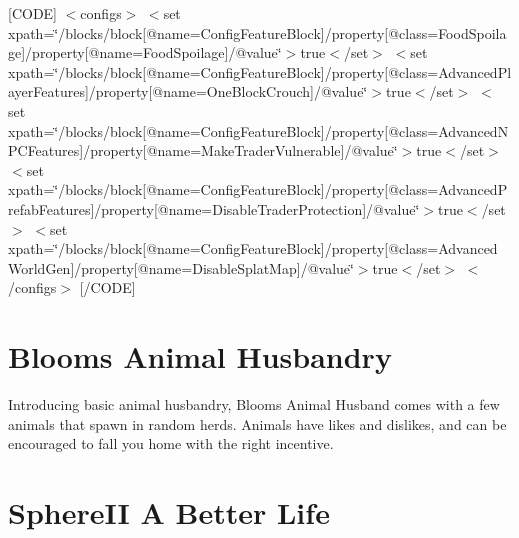 \mbox{[}C\+O\+DE\mbox{]} $<$configs$>$ $<$set xpath=\char`\"{}/blocks/block\mbox{[}@name=\textquotesingle{}\+Config\+Feature\+Block\textquotesingle{}\mbox{]}/property\mbox{[}@class=\textquotesingle{}\+Food\+Spoilage\textquotesingle{}\mbox{]}/property\mbox{[}@name=\textquotesingle{}\+Food\+Spoilage\textquotesingle{}\mbox{]}/@value\char`\"{}$>$true$<$/set$>$ $<$set xpath=\char`\"{}/blocks/block\mbox{[}@name=\textquotesingle{}\+Config\+Feature\+Block\textquotesingle{}\mbox{]}/property\mbox{[}@class=\textquotesingle{}\+Advanced\+Player\+Features\textquotesingle{}\mbox{]}/property\mbox{[}@name=\textquotesingle{}\+One\+Block\+Crouch\textquotesingle{}\mbox{]}/@value\char`\"{}$>$true$<$/set$>$ $<$set xpath=\char`\"{}/blocks/block\mbox{[}@name=\textquotesingle{}\+Config\+Feature\+Block\textquotesingle{}\mbox{]}/property\mbox{[}@class=\textquotesingle{}\+Advanced\+N\+P\+C\+Features\textquotesingle{}\mbox{]}/property\mbox{[}@name=\textquotesingle{}\+Make\+Trader\+Vulnerable\textquotesingle{}\mbox{]}/@value\char`\"{}$>$true$<$/set$>$ $<$set xpath=\char`\"{}/blocks/block\mbox{[}@name=\textquotesingle{}\+Config\+Feature\+Block\textquotesingle{}\mbox{]}/property\mbox{[}@class=\textquotesingle{}\+Advanced\+Prefab\+Features\textquotesingle{}\mbox{]}/property\mbox{[}@name=\textquotesingle{}\+Disable\+Trader\+Protection\textquotesingle{}\mbox{]}/@value\char`\"{}$>$true$<$/set$>$ $<$set xpath=\char`\"{}/blocks/block\mbox{[}@name=\textquotesingle{}\+Config\+Feature\+Block\textquotesingle{}\mbox{]}/property\mbox{[}@class=\textquotesingle{}\+Advanced\+World\+Gen\textquotesingle{}\mbox{]}/property\mbox{[}@name=\textquotesingle{}\+Disable\+Splat\+Map\textquotesingle{}\mbox{]}/@value\char`\"{}$>$true$<$/set$>$ $<$/configs$>$ \mbox{[}/\+C\+O\+DE\mbox{]}\hypertarget{md__c_1__users_jkilpatrick__documents__git_hub__sphere_i_i_8_mods__r_e_a_d_m_e_autotoc_md8}{}\section{Bloom\textquotesingle{}s Animal Husbandry}\label{md__c_1__users_jkilpatrick__documents__git_hub__sphere_i_i_8_mods__r_e_a_d_m_e_autotoc_md8}
Introducing basic animal husbandry, Bloom\textquotesingle{}s Animal Husband comes with a few animals that spawn in random herds. Animals have likes and dislikes, and can be encouraged to fall you home with the right incentive.\hypertarget{md__c_1__users_jkilpatrick__documents__git_hub__sphere_i_i_8_mods__r_e_a_d_m_e_autotoc_md9}{}\section{Sphere\+I\+I A Better Life}\label{md__c_1__users_jkilpatrick__documents__git_hub__sphere_i_i_8_mods__r_e_a_d_m_e_autotoc_md9}
